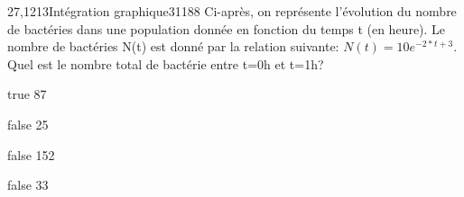 \documentclass[11pt]{article}
\begin{document}
        
          \begin{question}{27,1213}{Intégration graphique}{3}{1188}
             Ci-après, on représente l'évolution du nombre de bactéries dans une population donnée en fonction du temps t (en heure). Le nombre de bactéries N(t) est donné par la relation suivante: $ N(t) =10e^{-2*t+3} $. Quel est le nombre total de bactérie entre t=0h et t=1h?
            \begin{figure}
             \end{figure}
        \end{question}
        \begin{reponses}
            \item[true] 87
		    \item[false] 25
		    \item[false] 152
		    \item[false] 33
		    \end{reponses}
        
        
			
		
            
\end{document}
